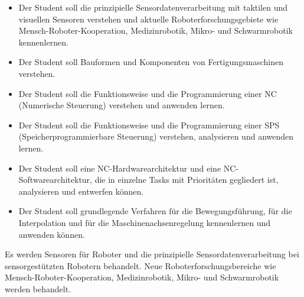 \begin{course}
\begin{learningoutcomes}
\begin{itemize}\item Der Student soll die prinzipielle Sensordatenverarbeitung mit taktilen und visuellen Sensoren verstehen und aktuelle Roboterforschungsgebiete wie Mensch-Roboter-Kooperation, Medizinrobotik, Mikro- und Schwarmrobotik kennenlernen.  \item Der Student soll Bauformen und Komponenten von Fertigungsmaschinen verstehen.   \item Der Student soll die Funktionsweise und die Programmierung einer NC (Numerische Steuerung) verstehen und anwenden lernen.  \item Der Student soll die Funktionsweise und die Programmierung einer SPS (Speicherprogrammierbare Steuerung) verstehen, analysieren und anwenden lernen.  \item Der Student soll eine NC-Hardwarearchitektur und eine NC-Softwarearchitektur, die in einzelne Tasks mit Prioritäten gegliedert ist, analysieren und entwerfen können.  \item Der Student soll grundlegende Verfahren für die Bewegungsführung, für die Interpolation und für die Maschinenachsenregelung kennenlernen und anwenden können.  \end{itemize}
\end{learningoutcomes}

\begin{content}
Es werden Sensoren für Roboter und die prinzipielle Sensordatenverarbeitung bei sensorgestützten Robotern behandelt. Neue Roboterforschungsbereiche wie Mensch-Roboter-Kooperation, Medizinrobotik, Mikro- und Schwarmrobotik werden behandelt.

 


\end{content}
\end{course}
